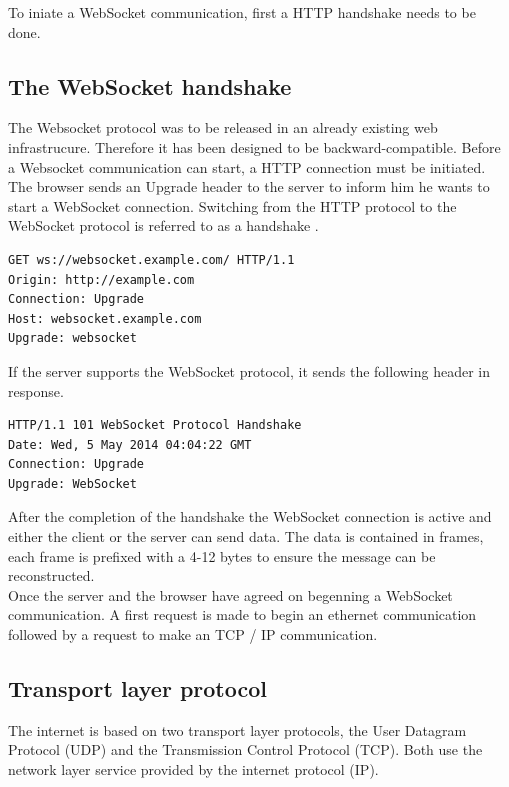 To iniate a WebSocket communication, first a HTTP handshake needs to be done.

\subsection{The WebSocket handshake}

The Websocket protocol was to be released in an already existing web
infrastrucure. Therefore it has been designed to be backward-compatible. Before
a Websocket communication can start, a HTTP connection must be initiated. The
browser sends an Upgrade header to the server to inform him he wants to start a
WebSocket connection. Switching from the HTTP protocol to the WebSocket
protocol is referred to as a handshake \citep{Reference12}.

\begin{verbatim}
GET ws://websocket.example.com/ HTTP/1.1
Origin: http://example.com
Connection: Upgrade
Host: websocket.example.com
Upgrade: websocket
\end{verbatim}

If the server supports the WebSocket protocol, it sends the following header in
response.

\begin{verbatim}
HTTP/1.1 101 WebSocket Protocol Handshake
Date: Wed, 5 May 2014 04:04:22 GMT
Connection: Upgrade
Upgrade: WebSocket
\end{verbatim}

After the completion of the handshake the WebSocket connection is active and
either the client or the server can send data. The data is contained in frames,
each frame is prefixed with a 4-12 bytes to ensure the message can be
reconstructed. \\ 

Once the server and the browser have agreed on begenning a WebSocket
communication. A first request is made to begin an ethernet communication
followed by a request to make an TCP / IP communication.\\

\subsection{Transport layer protocol}

The internet is based on two transport layer protocols, the User Datagram
Protocol (UDP) and the Transmission Control Protocol (TCP). Both use the
network layer service provided by the internet protocol (IP). \\

